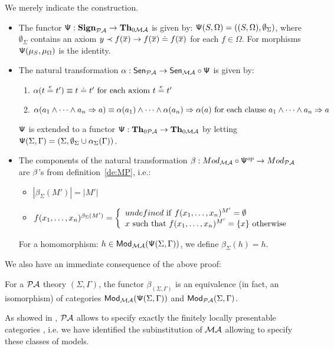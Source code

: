 \documentclass[10pt]{article}
\begin{document}
%
\begin{PROOFs} We merely indicate the construction.
\begin{itemize}\MyLPar
\item The functor ${\sf {\Psi}}: {\bf Sign}_{{\mathcal{PA}}} \to {\bf Th}_{0{\mathcal{MA}}}$ is given
by: ${\sf {\Psi}}(S,\Omega)= ((S,\Omega),\emptyset_{\Sigma})$, where
$\emptyset_{\Sigma}$ contains an axiom $y \prec f(\overline{x}) \to
f(\overline{x}) \mathrel{\dot{=} } f(\overline{x})$ for each $f\in\Omega$. For  morphisms
${\sf {\Psi}}(\mu_S,\mu_{\Omega})$ is the identity.  
\item The natural transformation
$\alpha: {\sf {Sen}}_{{\mathcal{PA}}} \to {\sf {Sen}}_{{\mathcal{MA}}} \circ {\sf {\Psi}}$ is given by:
   \begin{enumerate}\MyLPar 
    \item $\alpha(t \stackrel{e}{=} t') \equiv t \mathrel{\dot{=} } t'\mbox{ for
each axiom }t \stackrel{e}{=} t'$ 
    \item $\alpha(a_1 \wedge \cdots \wedge a_n
\Rightarrow a) \equiv \alpha(a_1) \wedge \cdots \wedge \alpha(a_n)
\Rightarrow \alpha(a)\mbox{ for each clause }a_1 \wedge \cdots \wedge
a_n \Rightarrow a$ 
   \end{enumerate}
${\sf {\Psi}}$ is extended to a functor 
${\sf {\Psi}}: {\bf Th}_{0{\mathcal{PA}}} \to {\bf Th}_{0{\mathcal{MA}}}$ by letting
${\sf {\Psi}}(\Sigma,\Gamma) = (\Sigma,\emptyset_\Sigma\cup\alpha_\Sigma(\Gamma))$.
%
\item 
The components of the natural transformation $\beta: Mod_{{\mathcal{MA}}}
	\circ {\sf {\Psi}}^{op} \to Mod_{{\mathcal{PA}}}$ are ${\sf {\beta}}$'s from definition~\ref{de:MP}, i.e.:
\begin{itemize}\MyLPar
	\item $|\beta_{\Sigma}(M')| = |M'|$
	\item $f(x_1, \ldots ,x_n)^{\beta_{\Sigma}(M')} = \left\{\begin{array}{l}
	  undefined\ {\rm if}\ f(x_1, \ldots ,x_n)^{M'}=\emptyset \\
          x\ {\rm such\ that}\ f(x_1, \ldots ,x_n)^{M'}=\{x\}\ {\rm otherwise} \end{array}\right.$
    \end{itemize}
For a homomorphism:  $h \in {\sf {Mod}}_{{\mathcal{MA}}}({\sf {\Psi}}(\Sigma,\Gamma))$, we define $\beta_\Sigma(h) = h$.
\end{itemize}\vspace*{-3ex}
\end{PROOFs}
We also have an immediate consequence of the above proof:
\begin{fact}\label{fa:iso}
For a ${\mathcal{PA}}$ theory $(\Sigma,\Gamma)$, 
the functor $\beta_{(\Sigma,\Gamma)}$ is an equivalence (in fact, an
isomorphism) of categories ${\sf {Mod}}_{{\mathcal{MA}}}({\sf {\Psi}}(\Sigma,\Gamma))$ and
${\sf {Mod}}_{{\mathcal{PA}}}(\Sigma,\Gamma)$. 
\end{fact}
%
As showed in \cite{mossa}, ${\mathcal{PA}}$ allows to
specify exactly the finitely locally presentable categories \cite{locally},
i.e. we have identified the subinstitution of ${\mathcal{MA}}$ allowing to specify
these classes of models. 
\end{document}
